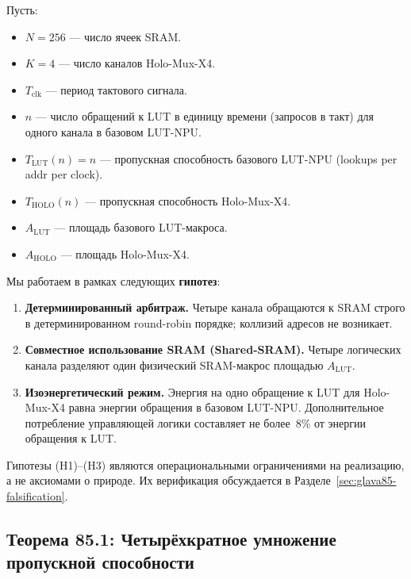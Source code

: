 Пусть:
\begin{itemize}
  \item $N = 256$ — число ячеек SRAM.
  \item $K = 4$ — число каналов Holo-Mux-X4.
  \item $T_{\mathrm{clk}}$ — период тактового сигнала.
  \item $n$ — число обращений к LUT в единицу времени (запросов в такт)
        для одного канала в базовом LUT-NPU.
  \item $T_{\mathrm{LUT}}(n) = n$ — пропускная способность базового LUT-NPU
        (lookups per addr per clock).
  \item $T_{\mathrm{HOLO}}(n)$ — пропускная способность Holo-Mux-X4.
  \item $A_{\mathrm{LUT}}$ — площадь базового LUT-макроса.
  \item $A_{\mathrm{HOLO}}$ — площадь Holo-Mux-X4.
\end{itemize}

Мы работаем в рамках следующих \textbf{гипотез}:

\begin{enumerate}
  \item[(H1)] \textbf{Детерминированный арбитраж.}
        Четыре канала обращаются к SRAM строго в детерминированном
        round-robin порядке; коллизий адресов не возникает.
  \item[(H2)] \textbf{Совместное использование SRAM (Shared-SRAM).}
        Четыре логических канала разделяют один физический SRAM-макрос
        площадью $A_{\mathrm{LUT}}$.
  \item[(H3)] \textbf{Изоэнергетический режим.}
        Энергия на одно обращение к LUT для Holo-Mux-X4 равна
        энергии обращения в базовом LUT-NPU.
        Дополнительное потребление управляющей логики составляет
        не более~8\% от энергии обращения к LUT.
\end{enumerate}

\begin{remark}
Гипотезы (H1)--(H3) являются операциональными ограничениями
на реализацию, а не аксиомами о природе.  Их верификация
обсуждается в Разделе~\ref{sec:glava85-falsification}.
\end{remark}

\subsection{Теорема 85.1: Четырёхкратное умножение пропускной способности}
\label{subsec:glava85-thm1}

